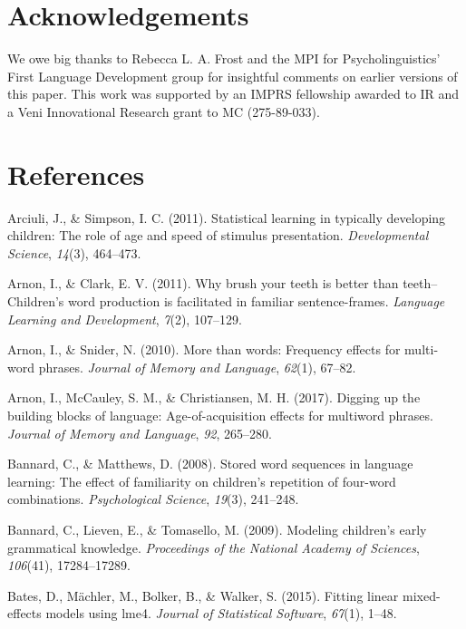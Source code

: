 \documentclass[man,mask,floatsintext]{apa6}
\theoremstyle{definition}
\theoremstyle{definition}
\theoremstyle{definition}
\theoremstyle{remark}
\begin{document}
\section{Acknowledgements}\label{acknowledgements}

We owe big thanks to Rebecca L. A. Frost and the MPI for
Psycholinguistics' First Language Development group for insightful
comments on earlier versions of this paper. This work was supported by
an IMPRS fellowship awarded to IR and a Veni Innovational Research grant
to MC (275-89-033).

\section{References}\label{references}

\begingroup
\setlength{\parindent}{-0.5in} \setlength{\leftskip}{0.5in}

\hypertarget{refs}{}
\hypertarget{ref-arciuli2011statistical}{}
Arciuli, J., \& Simpson, I. C. (2011). Statistical learning in typically
developing children: The role of age and speed of stimulus presentation.
\emph{Developmental Science}, \emph{14}(3), 464--473.

\hypertarget{ref-arnon2011brush}{}
Arnon, I., \& Clark, E. V. (2011). Why brush your teeth is better than
teeth--Children's word production is facilitated in familiar
sentence-frames. \emph{Language Learning and Development}, \emph{7}(2),
107--129.

\hypertarget{ref-arnon2010more}{}
Arnon, I., \& Snider, N. (2010). More than words: Frequency effects for
multi-word phrases. \emph{Journal of Memory and Language}, \emph{62}(1),
67--82.

\hypertarget{ref-arnon2017}{}
Arnon, I., McCauley, S. M., \& Christiansen, M. H. (2017). Digging up
the building blocks of language: Age-of-acquisition effects for
multiword phrases. \emph{Journal of Memory and Language}, \emph{92},
265--280.

\hypertarget{ref-bannard2008stored}{}
Bannard, C., \& Matthews, D. (2008). Stored word sequences in language
learning: The effect of familiarity on children's repetition of
four-word combinations. \emph{Psychological Science}, \emph{19}(3),
241--248.

\hypertarget{ref-bannard2009modeling}{}
Bannard, C., Lieven, E., \& Tomasello, M. (2009). Modeling children's
early grammatical knowledge. \emph{Proceedings of the National Academy
of Sciences}, \emph{106}(41), 17284--17289.

\hypertarget{ref-lme4}{}
Bates, D., Mächler, M., Bolker, B., \& Walker, S. (2015). Fitting linear
mixed-effects models using lme4. \emph{Journal of Statistical Software},
\emph{67}(1), 1--48.
\end{document}
